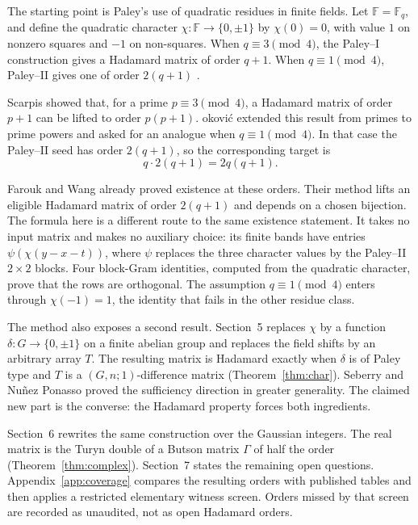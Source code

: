 \documentclass[11pt]{article}
\newcommand{\F}{\mathbb F}
\begin{document}
The starting point is Paley's use of quadratic residues in finite fields.  Let
\(\F=\F_q\), and define the quadratic character
\(\chi\colon\F\to\{0,\pm1\}\) by \(\chi(0)=0\), with value \(1\) on nonzero
squares and \(-1\) on non-squares.  When \(q\equiv3\pmod4\), the Paley--I
construction gives a Hadamard matrix of order \(q+1\).  When
\(q\equiv1\pmod4\), Paley--II gives one of order \(2(q+1)\)
\cite{Paley1933}.

Scarpis \cite{Scarpis1898} showed that, for a prime \(p\equiv3\pmod4\), a
Hadamard matrix of order \(p+1\) can be lifted to order \(p(p+1)\).
\DJ okovi\'c \cite{Djokovic2016} extended this result from primes to prime
powers and asked for an analogue when \(q\equiv1\pmod4\).  In that case the
Paley--II seed has order \(2(q+1)\), so the corresponding target is
\[
        q\cdot 2(q+1)=2q(q+1).
\]

Farouk and Wang \cite{FaroukWang2020} already proved existence at these
orders.  Their method lifts an eligible Hadamard matrix of order \(2(q+1)\)
and depends on a chosen bijection.  The formula here is a different route to
the same existence statement.  It takes no input matrix and makes no
auxiliary choice: its finite bands have entries
\(\psi(\chi(y-x-t))\), where \(\psi\) replaces the three character values by
the Paley--II \(2\times2\) blocks.  Four block-Gram identities, computed from
the quadratic character, prove that the rows are orthogonal.  The assumption
\(q\equiv1\pmod4\) enters through \(\chi(-1)=1\), the identity that fails in
the other residue class.

The method also exposes a second result.  Section~5 replaces \(\chi\) by a
function \(\delta\colon G\to\{0,\pm1\}\) on a finite abelian group and
replaces the field shifts by an arbitrary array \(T\).  The resulting matrix
is Hadamard exactly when \(\delta\) is of Paley type and \(T\) is a
\((G,n;1)\)-difference matrix (Theorem~\ref{thm:char}).  Seberry
\cite{Seberry1980} and Nu\~nez Ponasso \cite[Thm.~4.3.3]{Ponasso2024} proved
the sufficiency direction in greater generality.  The claimed new part is the
converse: the Hadamard property forces both ingredients.

Section~6 rewrites the same construction over the Gaussian integers.  The
real matrix is the Turyn double of a Butson matrix \(\Gamma\) of half the
order (Theorem~\ref{thm:complex}).  Section~7 states the remaining open
questions.  Appendix~\ref{app:coverage} compares the resulting orders with
published tables and then applies a restricted elementary witness screen.
Orders missed by that screen are recorded as unaudited, not as open Hadamard
orders.
\end{document}
